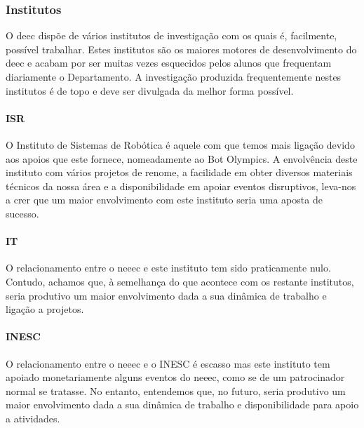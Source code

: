 
\subsubsection{Institutos}

O \acrshort{deec} dispõe de vários institutos de investigação com os quais é, facilmente, possível trabalhar. Estes institutos são os maiores motores de desenvolvimento do \acrshort{deec} e acabam por ser muitas vezes esquecidos pelos alunos que frequentam diariamente o Departamento. A investigação produzida frequentemente nestes institutos é de topo e deve ser divulgada da melhor forma possível.

\paragraph{ISR}

O Instituto de Sistemas de Robótica é aquele com que temos mais ligação devido aos apoios que este fornece, nomeadamente ao Bot Olympics. A envolvência deste instituto com vários projetos de renome, a facilidade em obter diversos materiais técnicos da nossa área e a disponibilidade em apoiar eventos disruptivos, leva-nos a crer que um maior envolvimento com este instituto seria uma aposta de sucesso.

\paragraph{IT}

O relacionamento entre o \acrshort{neeec} e este instituto tem sido praticamente nulo. Contudo, achamos que, à semelhança do que acontece com os restante institutos, seria produtivo um maior envolvimento dada a sua dinâmica de trabalho e ligação a projetos.

\paragraph{INESC}

O relacionamento entre o \acrshort{neeec} e o INESC é escasso mas este instituto tem apoiado monetariamente alguns eventos do \acrshort{neeec}, como se de um patrocinador normal se tratasse. No entanto, entendemos que, no futuro, seria produtivo um maior envolvimento dada a sua dinâmica de trabalho e disponibilidade para apoio a atividades.